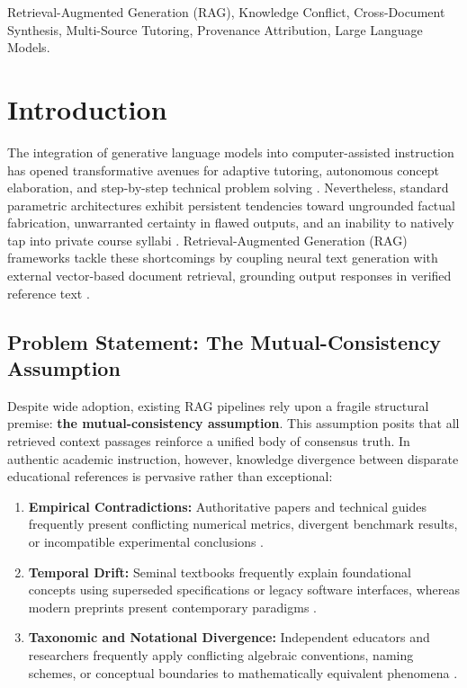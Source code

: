\documentclass[conference]{IEEEtran}
\begin{document}
\begin{IEEEkeywords}
Retrieval-Augmented Generation (RAG), Knowledge Conflict, Cross-Document Synthesis, Multi-Source Tutoring, Provenance Attribution, Large Language Models.
\end{IEEEkeywords}

\section{Introduction}
\label{sec:intro}
The integration of generative language models into computer-assisted instruction has opened transformative avenues for adaptive tutoring, autonomous concept elaboration, and step-by-step technical problem solving \cite{kasneci2023chatgpt, dan2024educhat}. Nevertheless, standard parametric architectures exhibit persistent tendencies toward ungrounded factual fabrication, unwarranted certainty in flawed outputs, and an inability to natively tap into private course syllabi \cite{shuster2021retrieval}. Retrieval-Augmented Generation (RAG) frameworks tackle these shortcomings by coupling neural text generation with external vector-based document retrieval, grounding output responses in verified reference text \cite{lewis2020retrieval, gao2023retrieval}.

\subsection{Problem Statement: The Mutual-Consistency Assumption}
Despite wide adoption, existing RAG pipelines rely upon a fragile structural premise: \textbf{the mutual-consistency assumption}. This assumption posits that all retrieved context passages reinforce a unified body of consensus truth. In authentic academic instruction, however, knowledge divergence between disparate educational references is pervasive rather than exceptional:
\begin{enumerate}
    \item \textbf{Empirical Contradictions:} Authoritative papers and technical guides frequently present conflicting numerical metrics, divergent benchmark results, or incompatible experimental conclusions \cite{chen2023understanding}.
    \item \textbf{Temporal Drift:} Seminal textbooks frequently explain foundational concepts using superseded specifications or legacy software interfaces, whereas modern preprints present contemporary paradigms \cite{xu2024knowledge}.
    \item \textbf{Taxonomic and Notational Divergence:} Independent educators and researchers frequently apply conflicting algebraic conventions, naming schemes, or conceptual boundaries to mathematically equivalent phenomena \cite{wang2023resolving}.
\end{enumerate}
\end{document}
